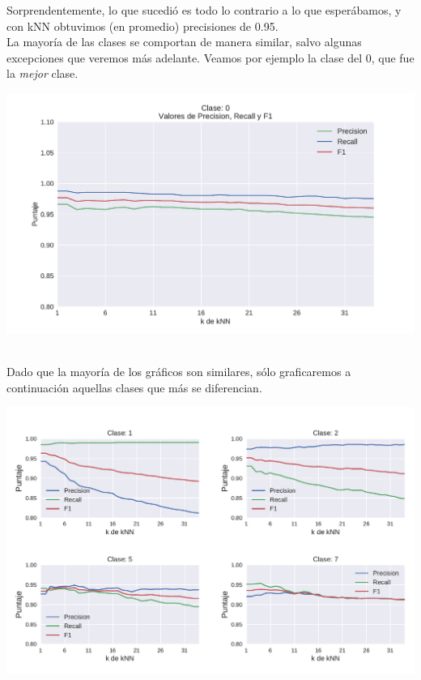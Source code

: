 Sorprendentemente, lo que sucedió es todo lo contrario a lo que esperábamos, y con kNN obtuvimos (en promedio) precisiones de 0.95. \\

La mayoría de las clases se comportan de manera similar, salvo algunas excepciones que veremos más adelante. Veamos por ejemplo la clase del 0, que fue la \textit{mejor} clase.

{\centering
    \includegraphics[scale=0.55]{informe/imagenes/knn/precisionClase0.pdf} \\
}
$ $\newline

Dado que la mayoría de los gráficos son similares, sólo graficaremos a continuación aquellas clases que más se diferencian.

{\centering
    \includegraphics[scale=0.70]{informe/imagenes/knn/precisionClase1257.pdf} \\
}
$ $\newline

